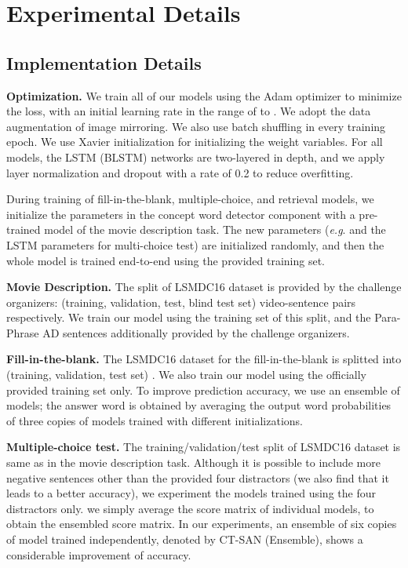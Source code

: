 \documentclass[10pt,twocolumn,letterpaper]{article}
\makeatletter
\theoremstyle{nonumberplain}
\DeclareRobustCommand\onedot{\futurelet\@let@token\@onedot}
\def\onedot{.\@\xspace}
\def\eg{\emph{e.g}\onedot} \def\Eg{\emph{E.g}\onedot}
\makeatother
\begin{document}
\section{Experimental Details}
\label{sec:supp_exp_details}

\subsection{Implementation Details}
\label{subsec:supp_implementation_details}

\textbf{Optimization.}
We train all of our models using the Adam optimizer \cite{kingma-iclr-2015} to minimize the loss, with an initial learning rate in the range of  to .
We adopt the data augmentation of image mirroring.
We also use batch shuffling in every training epoch.
We use Xavier initialization \cite{glorot-AISTATS-2010} for initializing the weight variables.
For all models, the LSTM (BLSTM) networks are two-layered in depth,
and we apply layer normalization \cite{Jimmy-arxiv-2016} and dropout \cite{srivastava-jmlr-2014} with a rate of 0.2
to reduce overfitting.

During training of fill-in-the-blank, multiple-choice, and retrieval models,
we initialize the parameters in the concept word detector component
with a pre-trained model of the movie description task.
The new parameters (\eg  and the LSTM parameters for multi-choice test) are
initialized randomly,
and then the whole model is trained end-to-end using the provided training set.

\medskip

\textbf{Movie Description.}
The split of LSMDC16 dataset is provided by the challenge organizers:
(training, validation, test, blind test set)  video-sentence pairs respectively.
We train our model using the training set of this split,
and the Para-Phrase AD sentences additionally provided by the challenge organizers.

\textbf{Fill-in-the-blank.}
The LSMDC16 dataset for the fill-in-the-blank is splitted into (training, validation, test set) .
We also train our model using the officially provided training set only.
To improve prediction accuracy, we use an ensemble of models; the answer word is obtained
by averaging the output word probabilities of three copies of models trained with different initializations.

\textbf{Multiple-choice test.}
The training/validation/test split of LSMDC16 dataset is same as in the movie description task.
Although it is possible to include more negative sentences other than the provided four distractors
(we also find that it leads to a better accuracy), we experiment the models trained
using the four distractors only. we simply average the score matrix  of individual models, to obtain the ensembled score matrix.
In our experiments, an ensemble of six copies of model trained independently,
denoted by CT-SAN (Ensemble), shows a considerable improvement of accuracy.
\end{document}
